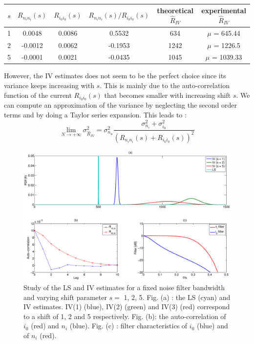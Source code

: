 \begin{table}[ht]
\centering
\begin{tabular}{|c|c|c|c|c|c|}
\hline
$s$ & $R_{n_i n_i}(s)$ & $R_{i_0 i_0}(s)$ & $R_{n_i n_i}(s)/R_{i_0 i_0}(s)$ & theoretical $\hat{R}_{IV}$ & experimental $\hat{R}_{IV}$ \\
\hline
\hline
1 & 0.0048 & 0.0086 & 0.5532 & 634 & $\mu$ = 645.44\\
\hline
2 & -0.0012 & 0.0062 & -0.1953 & 1242 & $\mu$ = 1226.5 \\
\hline
5 & -0.0001 & 0.0021 & -0.0435 & 1045 & $\mu$ = 1039.33 \\
\hline
\end{tabular}\caption{}\label{tab: Sess1_part1_exp2}
\end{table}
However, the IV estimates does not seem to be the perfect choice since its variance keeps increasing with $s$. This is mainly due to the auto-correlation function of the current $R_{i_0 i_0}(s)$  that becomes smaller with increasing shift $s$. We can compute an approximation of the variance by neglecting the second order terms and by doing a Taylor series expansion. This leads to :
\begin{equation}
\lim\limits_{N \rightarrow +\infty} \sigma^2_{\hat{R}_{IV}} = \sigma^2_{n_u} \frac{\sigma^2_{n_i}  + \sigma^2_{i_0}}{(R_{n_i n_i}(s) + R_{i_0 i_0}(s))^2}
\end{equation}


\begin{figure}[H]
    \centering
    \includegraphics[width=1\textwidth]{Figures/Sess1_part1_exp2.eps}
    \caption{Study of the LS and IV estimates for a fixed noise filter bandwidth and varying shift parameter $s =$ {1, 2, 5}. Fig. (a) : the LS (cyan) and IV estimates. IV(1) (blue), IV(2) (green) and IV(3) (red) correspond to a shift of 1, 2 and 5 respectively. Fig. (b): the auto-correlation of $i_0$ (red) and $n_i$ (blue). Fig. (c) : filter characteristics of $i_0$ (blue) and of $n_i$ (red).}
    \label{fig: Sess1_part1_exp2}
\end{figure}
